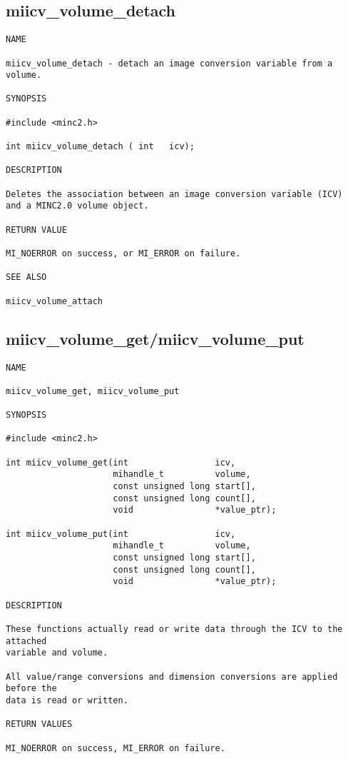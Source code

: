 \documentclass{article}
\begin{document}
\subsection{miicv\_volume\_detach}
\begin{verbatim}
NAME

miicv_volume_detach - detach an image conversion variable from a volume.

SYNOPSIS

#include <minc2.h>

int miicv_volume_detach ( int   icv);

DESCRIPTION

Deletes the association between an image conversion variable (ICV) 
and a MINC2.0 volume object.

RETURN VALUE

MI_NOERROR on success, or MI_ERROR on failure.

SEE ALSO 

miicv_volume_attach
\end{verbatim}

\subsection{miicv\_volume\_get/miicv\_volume\_put}
\begin{verbatim}
NAME

miicv_volume_get, miicv_volume_put
                
SYNOPSIS

#include <minc2.h>

int miicv_volume_get(int                 icv, 
                     mihandle_t          volume, 
                     const unsigned long start[], 
                     const unsigned long count[], 
                     void                *value_ptr);

int miicv_volume_put(int                 icv, 
                     mihandle_t          volume, 
                     const unsigned long start[], 
                     const unsigned long count[], 
                     void                *value_ptr);

DESCRIPTION

These functions actually read or write data through the ICV to the attached 
variable and volume.

All value/range conversions and dimension conversions are applied before the
data is read or written.

RETURN VALUES

MI_NOERROR on success, MI_ERROR on failure.
\end{verbatim}
\end{document}
